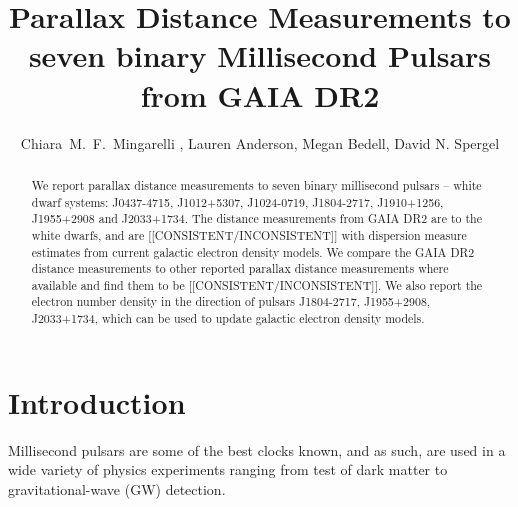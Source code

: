 \documentclass[iop,apj]{emulateapj}
\begin{document}
\title{Parallax Distance Measurements to seven binary Millisecond Pulsars from GAIA DR2}
 
\author{
Chiara~M.~F.~Mingarelli , 
Lauren Anderson,
Megan Bedell,
David N. Spergel
}



\begin{abstract}
We report parallax distance measurements to seven binary millisecond pulsars -- white dwarf systems: J0437-4715, J1012+5307, J1024-0719, J1804-2717, J1910+1256, J1955+2908 and J2033+1734. The distance measurements from GAIA DR2 are to the white dwarfs, and are [[CONSISTENT/INCONSISTENT]] with dispersion measure estimates from current galactic electron density models. We compare the GAIA DR2 distance measurements to other reported parallax distance measurements where available and find them to be [[CONSISTENT/INCONSISTENT]]. We also report the electron number density in the direction of pulsars J1804-2717, J1955+2908, J2033+1734, which can be used to update galactic electron density models.
\end{abstract}


\section{Introduction}
\label{sec:intro}
Millisecond pulsars are some of the best clocks known, and as such, are used in a wide variety of physics experiments ranging from test of dark matter to gravitational-wave (GW) detection.
\end{document}
